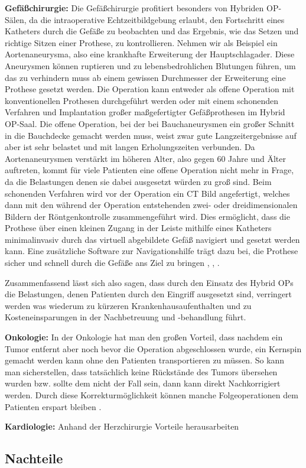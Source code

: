 \textbf{Gefäßchirurgie:}
Die Gefäßchirurgie profitiert besonders von Hybriden OP-Sälen, da die intraoperative Echtzeitbildgebung erlaubt, den Fortschritt eines Katheters durch die Gefäße zu beobachten und das Ergebnis, wie das Setzen und richtige Sitzen einer Prothese, zu kontrollieren.
Nehmen wir als Beispiel ein Aortenaneurysma, also eine krankhafte Erweiterung der Hauptschlagader. Diese Aneurysmen können ruptieren und zu lebensbedrohlichen Blutungen führen, um das zu verhindern muss ab einem gewissen Durchmesser der Erweiterung eine Prothese gesetzt werden. Die Operation kann entweder als offene Operation mit konventionellen Prothesen durchgeführt werden oder mit einem schonenden Verfahren und Implantation großer maßgefertigter Gefäßprothesen im Hybrid OP-Saal. Die offene Operation, bei der bei Bauchaneurysmen ein großer Schnitt in die Bauchdecke gemacht werden muss, weist zwar gute Langzeitergebnisse auf aber ist sehr belastet und mit langen Erholungszeiten verbunden. Da Aortenaneurysmen verstärkt im höheren Alter, also gegen 60 Jahre und Älter auftreten, kommt für viele Patienten eine offene Operation nicht mehr in Frage, da die Belastungen denen sie dabei ausgesetzt würden zu groß sind. 
Beim schonenden Verfahren wird vor der Operation ein CT Bild angefertigt, welches dann mit den während der Operation entstehenden zwei- oder dreidimensionalen Bildern der Röntgenkontrolle zusammengeführt wird. Dies ermöglicht, dass die Prothese über einen kleinen Zugang in der Leiste mithilfe eines Katheters minimalinvasiv durch das virtuell abgebildete Gefäß navigiert und gesetzt werden kann. Eine zusätzliche Software zur Navigationshilfe trägt dazu bei, die Prothese sicher und schnell durch die Gefäße ans Ziel zu bringen \cite{Aortenaneurysma}, \cite{DresdnerUniklinikum}, \cite{TickendeBombeImBauch}.

Zusammenfassend lässt sich also sagen, dass durch den Einsatz des Hybrid OPs die Belastungen, denen Patienten durch den Eingriff ausgesetzt sind, verringert werden was wiederum zu kürzeren Krankenhausaufenthalten und zu Kosteneinsparungen in der Nachbetreuung und -behandlung führt. 


 
\textbf{Onkologie:}
In der Onkologie hat man den großen Vorteil, dass nachdem ein Tumor entfernt aber noch bevor die Operation abgeschlossen wurde, ein Kernspin gemacht werden kann ohne den Patienten transportieren zu müssen. So kann man sicherstellen, dass tatsächlich keine Rückstände des Tumors übersehen wurden bzw. sollte dem nicht der Fall sein, dann kann direkt Nachkorrigiert werden. Durch diese Korrekturmöglichkeit können manche Folgeoperationen dem Patienten erspart bleiben \cite{AerzteZeitung}.

\textbf{Kardiologie:}
Anhand der Herzchirurgie Vorteile herausarbeiten


\subsection{Nachteile}


